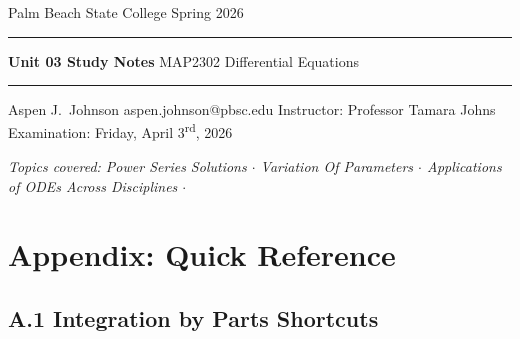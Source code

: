 \documentclass[10pt]{article}
\begin{document}
\thispagestyle{empty}
\vspace*{3cm}

\begin{center}
    {\fontsize{13}{13}\selectfont\sffamily Palm Beach State College \quad\textbullet\quad Spring 2026}
    \vskip 20pt
    \rule{0.6\linewidth}{0.4pt}
    \vskip 20pt
    {\fontsize{28}{28}\selectfont\bfseries\sffamily Unit 03 Study Notes}
    \vskip 12pt
    {\fontsize{16}{16}\selectfont\rmfamily MAP2302 \quad Differential Equations}
    \vskip 20pt
    \rule{0.6\linewidth}{0.4pt}
    \vskip 24pt
    {\fontsize{15}{15}\selectfont\rmfamily Aspen J.\ Johnson}
    \vskip 6pt
    {\fontsize{11}{11}\selectfont\ttfamily aspen.johnson@pbsc.edu}
    \vskip 30pt
    {\fontsize{11}{11}\selectfont\rmfamily
        Instructor: Professor Tamara Johns\\[4pt]
        Examination: Friday, April 3\textsuperscript{rd}, 2026
    }
\end{center}

\vfill

\begin{center}
{\small\itshape
Topics covered: Power Series Solutions $\cdot$ Variation Of Parameters $\cdot$
Applications of ODEs Across Disciplines $\cdot$}
\end{center}
\newpage




\microtoc

\newpage
\section*{Appendix: Quick Reference}

\subsection*{A.1 \quad Integration by Parts Shortcuts}
\end{document}
